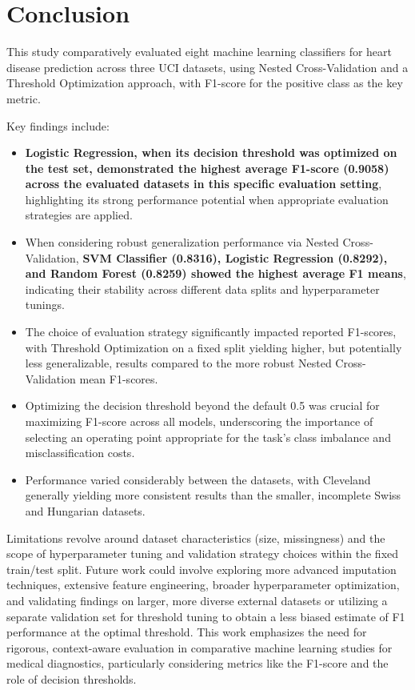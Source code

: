 \documentclass{article}
\begin{document}
\section{Conclusion}
This study comparatively evaluated eight machine learning classifiers for heart disease prediction across three UCI datasets, using Nested Cross-Validation and a Threshold Optimization approach, with F1-score for the positive class as the key metric.

Key findings include:
\begin{itemize}
    \item \textbf{Logistic Regression, when its decision threshold was optimized on the test set, demonstrated the highest average F1-score (0.9058) across the evaluated datasets in this specific evaluation setting}, highlighting its strong performance potential when appropriate evaluation strategies are applied.
    \item When considering robust generalization performance via Nested Cross-Validation, \textbf{SVM Classifier (0.8316), Logistic Regression (0.8292), and Random Forest (0.8259) showed the highest average F1 means}, indicating their stability across different data splits and hyperparameter tunings.
    \item The choice of evaluation strategy significantly impacted reported F1-scores, with Threshold Optimization on a fixed split yielding higher, but potentially less generalizable, results compared to the more robust Nested Cross-Validation mean F1-scores.
    \item Optimizing the decision threshold beyond the default 0.5 was crucial for maximizing F1-score across all models, underscoring the importance of selecting an operating point appropriate for the task's class imbalance and misclassification costs.
    \item Performance varied considerably between the datasets, with Cleveland generally yielding more consistent results than the smaller, incomplete Swiss and Hungarian datasets.
\end{itemize}

Limitations revolve around dataset characteristics (size, missingness) and the scope of hyperparameter tuning and validation strategy choices within the fixed train/test split. Future work could involve exploring more advanced imputation techniques, extensive feature engineering, broader hyperparameter optimization, and validating findings on larger, more diverse external datasets or utilizing a separate validation set for threshold tuning to obtain a less biased estimate of F1 performance at the optimal threshold. This work emphasizes the need for rigorous, context-aware evaluation in comparative machine learning studies for medical diagnostics, particularly considering metrics like the F1-score and the role of decision thresholds.
\end{document}

